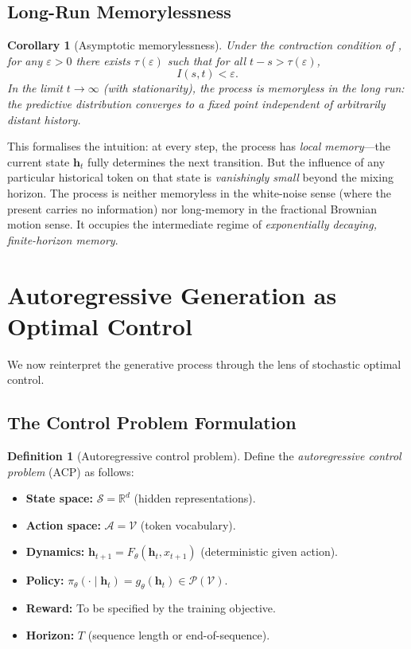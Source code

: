 \documentclass[11pt,a4paper]{article}
\theoremstyle{plain}
\newtheorem{corollary}[theorem]{Corollary}
\theoremstyle{definition}
\newtheorem{definition}[theorem]{Definition}
\theoremstyle{remark}
\newcommand{\R}{\mathbb{R}}
\newcommand{\cS}{\mathcal{S}}
\newcommand{\cA}{\mathcal{A}}
\newcommand{\cP}{\mathcal{P}}
\newcommand{\vocab}{\mathcal{V}}
\begin{document}
\subsection{Long-Run Memorylessness}

\begin{corollary}[Asymptotic memorylessness]\label{cor:memoryless}
Under the contraction condition of , for any $\varepsilon > 0$
there exists $\tau(\varepsilon)$ such that for all $t - s > \tau(\varepsilon)$,
\[
  I(s, t) < \varepsilon.
\]
In the limit $t \to \infty$ (with stationarity), the process is \emph{memoryless
in the long run}: the predictive distribution converges to a fixed point
independent of arbitrarily distant history.
\end{corollary}

This formalises the intuition: at every step, the process has \emph{local
memory}---the current state $\bm{h}_t$ fully determines the next transition.
But the influence of any particular historical token on that state is
\emph{vanishingly small} beyond the mixing horizon. The process is neither
memoryless in the white-noise sense (where the present carries no information)
nor long-memory in the fractional Brownian motion sense. It occupies the
intermediate regime of \emph{exponentially decaying, finite-horizon memory}.


\section{Autoregressive Generation as Optimal Control}\label{sec:control}

We now reinterpret the generative process through the lens of stochastic
optimal control.

\subsection{The Control Problem Formulation}

\begin{definition}[Autoregressive control problem]\label{def:arp}
Define the \emph{autoregressive control problem} (ACP) as follows:
\begin{itemize}[nosep]
  \item \textbf{State space:} $\cS = \R^d$ (hidden representations).
  \item \textbf{Action space:} $\cA = \vocab$ (token vocabulary).
  \item \textbf{Dynamics:} $\bm{h}_{t+1} = F_\theta(\bm{h}_t, x_{t+1})$
        (deterministic given action).
  \item \textbf{Policy:} $\pi_\theta(\cdot \mid \bm{h}_t) = g_\theta(\bm{h}_t)
        \in \cP(\vocab)$.
  \item \textbf{Reward:} To be specified by the training objective.
  \item \textbf{Horizon:} $T$ (sequence length or end-of-sequence).
\end{itemize}
\end{definition}
\end{document}
